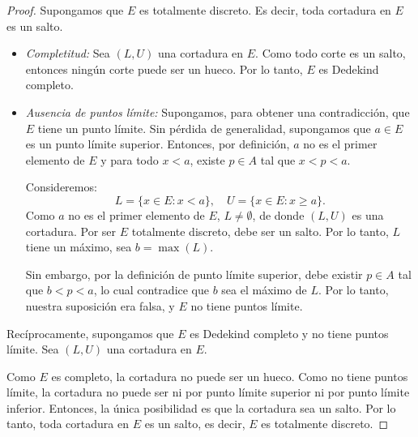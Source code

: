 \documentclass[a4,10pt]{aleph-notas}
\begin{document}
\begin{proof}
Supongamos que \( E \) es totalmente discreto. Es decir, toda cortadura en \( E \) es un salto.

\begin{itemize}
    \item \textit{Completitud:} Sea \( (L, U) \) una cortadura en \( E \). Como todo corte es un salto, entonces ningún corte puede ser un hueco. Por lo tanto, \( E \) es Dedekind completo.

    \item \textit{Ausencia de puntos límite:} Supongamos, para obtener una contradicción, que \( E \) tiene un punto límite. 
    Sin pérdida de generalidad, supongamos que \( a \in E \) es un punto límite superior. 
    Entonces, por definición, $a$ no es el primer elemento de $E$ y para todo \( x < a \), existe \( p \in A \) tal que \( x < p < a \).

    Consideremos:
    \[
    L = \{x \in E : x < a\}, \quad U = \{x \in E : x \ge a\}.
    \]
    Como $a$ no es el primer elemento de $E$, $L\neq \emptyset$, de donde $(L,U)$ es una cortadura. Por ser \( E \) totalmente discreto, debe ser un salto. 
    Por lo tanto, \( L \) tiene un máximo, sea \( b = \max(L) \).

    Sin embargo, por la definición de punto límite superior, debe existir \( p \in A \) tal que \( b < p < a \), lo cual contradice que \( b \) sea el máximo de \( L \). 
    Por lo tanto, nuestra suposición era falsa, y \( E \) no tiene puntos límite.
\end{itemize}

Recíprocamente, supongamos que \( E \) es Dedekind completo y no tiene puntos límite. 
Sea \( (L, U) \) una cortadura en \( E \).

Como \( E \) es completo, la cortadura no puede ser un hueco. 
Como no tiene puntos límite, la cortadura no puede ser ni por punto límite superior ni por punto límite inferior. 
Entonces, la única posibilidad es que la cortadura sea un salto. Por lo tanto, toda cortadura en \( E \) es un salto, es decir, \( E \) es totalmente discreto. 
\end{proof}
\end{document}
